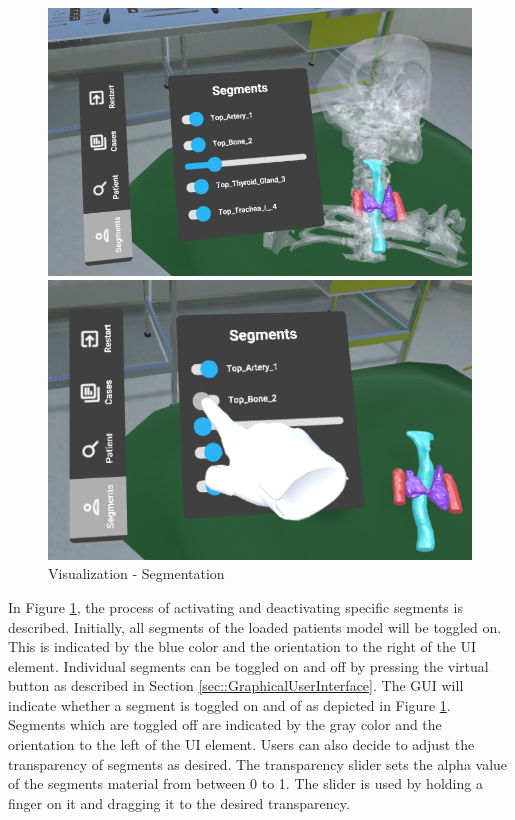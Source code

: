 \begin{figure}[ht]
  \centering
  \begin{minipage}{.5\textwidth}
    \centering
    \includegraphics[width=0.95\linewidth]{images/implementation/features/visualization/segments_1.png}
  \end{minipage}%
  \begin{minipage}{.5\textwidth}
    \centering
    \includegraphics[width=0.915\linewidth]{images/implementation/features/visualization/segments_2.png}
  \end{minipage}
  \caption{\label{fig::Segmentation}Visualization - Segmentation}
\end{figure}

In Figure \ref{fig::Segmentation}, the process of activating and deactivating specific segments is described.
Initially, all segments of the loaded patients model will be toggled on.
This is indicated by the blue color and the orientation to the right of the UI element.
Individual segments can be toggled on and off by pressing the virtual button as described in Section \ref{sec::GraphicalUserInterface}.
The GUI will indicate whether a segment is toggled on and of as depicted in Figure \ref{fig::Segmentation}.
Segments which are toggled off are indicated by the gray color and the orientation to the left of the UI element.
Users can also decide to adjust the transparency of segments as desired.
The transparency slider sets the alpha value of the segments material from between 0 to 1.
The slider is used by holding a finger on it and dragging it to the desired transparency.

